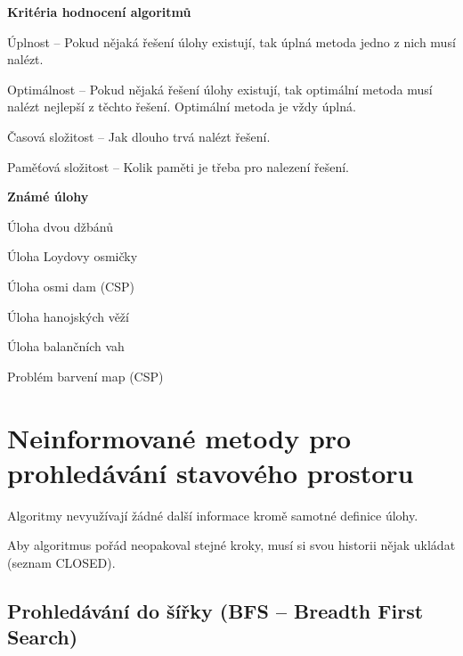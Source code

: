 \begin{compactitem}
    \item \textbf{Kritéria hodnocení algoritmů} \begin{compactitem}
        \item Úplnost -- Pokud nějaká řešení úlohy existují, tak úplná metoda jedno z nich musí nalézt.
        \item Optimálnost -- Pokud nějaká řešení úlohy existují, tak optimální metoda musí nalézt nejlepší z těchto řešení. Optimální metoda je vždy úplná.
        \item Časová složitost -- Jak dlouho trvá nalézt řešení.
        \item Paměťová složitost -- Kolik paměti je třeba pro nalezení řešení.
    \end{compactitem}

    \item \textbf{Známé úlohy} \begin{compactitem}
        \item Úloha dvou džbánů
        \item Úloha Loydovy osmičky
        \item Úloha osmi dam (CSP)
        \item Úloha hanojských věží
        \item Úloha balančních vah
        \item Problém barvení map (CSP)
    \end{compactitem}
\end{compactitem}


\section{Neinformované metody pro prohledávání stavového prostoru}

\begin{compactitem}
    \item Algoritmy nevyužívají žádné další informace kromě samotné definice úlohy.

    \item Aby algoritmus pořád neopakoval stejné kroky, musí si svou historii nějak ukládat (seznam CLOSED).
\end{compactitem}

\subsection{Prohledávání do šířky (BFS -- Breadth First Search)}

